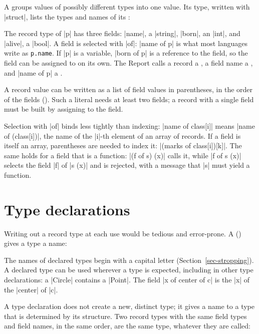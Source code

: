 A  groups values of possibly different types into one value.
Its type, written with \code|struct|, lists the types and names of its
:


The record type of \code|p| has three fields: \code|name|, a
\code|string|, \code|born|, an \code|int|, and \code|alive|, a
\code|bool|. A field is selected with \code|of|: \code|name of p| is what
most languages write as \texttt{p.name}. If \code|p| is a variable,
\code|born of p| is a reference to the field, so the field can be
assigned to on its own. The Report calls a record a , a field
name a , and \code|name of p| a .

A record value can be written as a list of field values in parentheses,
in the order of the fields (). Such a literal needs at
least two fields; a record with a single field must be built by
assigning to the field.

Selection with \code|of| binds less tightly than indexing:
\code|name of class[i]| means \code|name of (class[i])|, the name of the
\code|i|-th element of an array of records. If a field is itself an array,
parentheses are needed to index it: \code|(marks of class[i])[k]|.
The same holds for a field that is a function: \code|(f of s) (x)|
calls it, while \code|f of s (x)| selects the field \code|f| of
\code|s (x)| and is rejected, with a message that \code|s| must yield a function.

\section{Type declarations}\label{sec-modes}

Writing out a record type at each use would be tedious and error-prone.
A  () gives a type a name:


The names of declared types begin with a capital letter
(Section~\ref{sec-stropping}). A declared type can be used wherever a type
is expected, including in other type declarations: a \code|Circle|
contains a \code|Point|. The field \code|x of center of c| is the
\code|x| of the \code|center| of \code|c|.

A type declaration does not create a new, distinct type; it gives a name
to a type that is determined by its structure. Two record types with the
same field types and field names, in the same order, are the same type,
whatever they are called:

